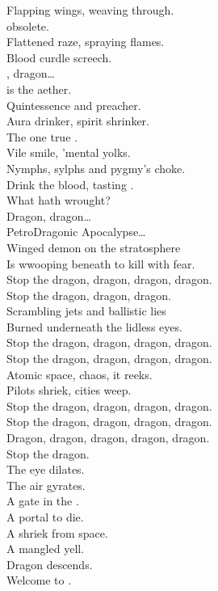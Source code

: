 Flapping wings, weaving through. \\
 obsolete. \\
Flattened raze, spraying flames. \\
Blood curdle screech. \\

, dragon… \\

 is the aether. \\
Quintessence and preacher. \\
Aura drinker, spirit shrinker. \\
The one true . \\
Vile smile, 'mental yolks. \\
Nymphs, sylphs and pygmy's choke. \\
Drink the blood, tasting . \\
What hath  wrought? \\

Dragon, dragon… \\

PetroDragonic Apocalypse… \\

Winged demon on the stratosphere \\
Is wwooping beneath to kill with fear. \\
Stop the dragon, dragon, dragon, dragon. \\
Stop the dragon, dragon, dragon. \\

Scrambling jets and ballistic lies \\
Burned underneath the lidless eyes. \\
Stop the dragon, dragon, dragon, dragon. \\
Stop the dragon, dragon, dragon, dragon. \\

Atomic space, chaos, it reeks. \\
Pilots shriek, cities weep. \\
Stop the dragon, dragon, dragon, dragon. \\
Stop the dragon, dragon, dragon, dragon. \\
Dragon, dragon, dragon, dragon, dragon. \\
Stop the dragon. \\

The eye dilates. \\
The air gyrates. \\
A gate in the . \\
A portal to die. \\
A shriek from space. \\
A mangled yell. \\
Dragon descends. \\
Welcome to . \\


